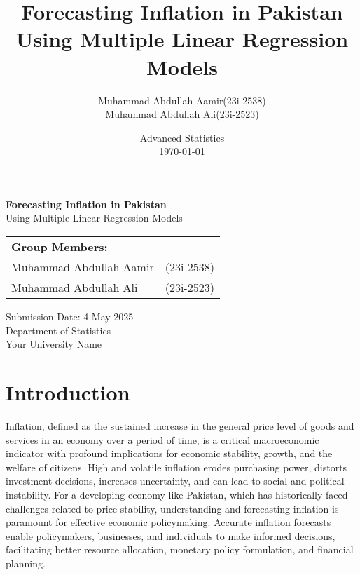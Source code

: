 \documentclass[12pt,a4paper]{article}
\title{\Huge\bfseries Forecasting Inflation in Pakistan\\[1ex]
       \large Using Multiple Linear Regression Models}
\author{%
  \begin{tabular}{ll}
    Muhammad Abdullah Aamir & (23i-2538) \\
    Muhammad Abdullah Ali   & (23i-2523) \\
  \end{tabular}
}
\date{%
  \large Advanced Statistics\\
  \vspace{2em}%
  \today
}
\begin{document}
\begin{titlepage}
  \begin{center}
    \vspace*{2cm}
    {\huge\bfseries Forecasting Inflation in Pakistan}\\[2ex]
    {\large Using Multiple Linear Regression Models}\\[1cm]
    
    \begin{singlespacing}
    \begin{tabular}{ll}
      \textbf{Group Members:} &  \\
      Muhammad Abdullah Aamir & (23i-2538) \\
      Muhammad Abdullah Ali   & (23i-2523) \\
    \end{tabular}
    \end{singlespacing}
    
    \vfill
    
    {\large Submission Date: 4 May 2025}\\[1ex]
    {\large Department of Statistics\\[.5ex]
    Your University Name}
  \end{center}
\end{titlepage}

\tableofcontents
\newpage

\section{Introduction}
Inflation, defined as the sustained increase in the general price level of goods and services in an economy over a period of time, is a critical macroeconomic indicator with profound implications for economic stability, growth, and the welfare of citizens. High and volatile inflation erodes purchasing power, distorts investment decisions, increases uncertainty, and can lead to social and political instability. For a developing economy like Pakistan, which has historically faced challenges related to price stability, understanding and forecasting inflation is paramount for effective economic policymaking. Accurate inflation forecasts enable policymakers, businesses, and individuals to make informed decisions, facilitating better resource allocation, monetary policy formulation, and financial planning.
\end{document}
